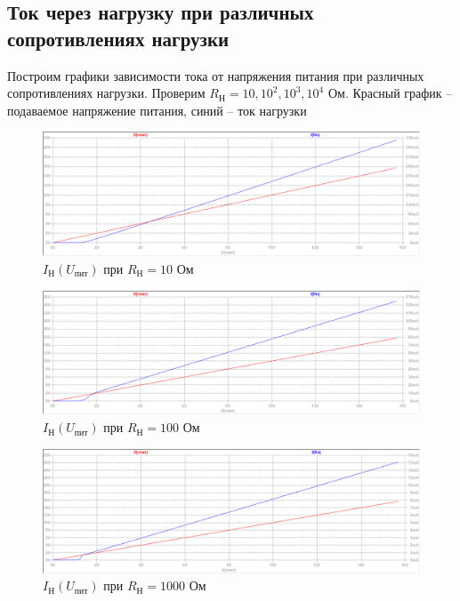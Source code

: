 \documentclass[a4paper, 12pt]{article}
\begin{document}
    \subsection{Ток через нагрузку при различных сопротивлениях нагрузки}
    Построим графики зависимости тока от напряжения питания при различных сопротивлениях нагрузки.
    Проверим $R_\text{Н}=10,10^2,10^3,10^4$ Ом. Красный график -- подаваемое напряжение питания,
    синий -- ток нагрузки
    \begin{figure}[H]
        \centering
        \includegraphics[scale=0.46]{2task_Iн(Vпит)_Rн10.png}
        \captionsetup{skip=0pt}
        \caption{$I_\text{Н}\left( U_\text{пит} \right)$ при $R_\text{Н}=10$ Ом}
        \label{fig:2task_InVlR10}
    \end{figure}
    \begin{figure}[H]
        \centering
        \includegraphics[scale=0.46]{2task_Iн(Vпит)_Rн100.png}
        \captionsetup{skip=0pt}
        \caption{$I_\text{Н}\left( U_\text{пит} \right)$ при $R_\text{Н}=100$ Ом}
        \label{fig:2task_InVlR100}
    \end{figure}
    \begin{figure}[H]
        \centering
        \includegraphics[scale=0.46]{2task_Iн(Vпит)_Rн1000.png}
        \captionsetup{skip=0pt}
        \caption{$I_\text{Н}\left( U_\text{пит} \right)$ при $R_\text{Н}=1000$ Ом}
        \label{fig:2task_InVlR1000}
    \end{figure}
\end{document}
